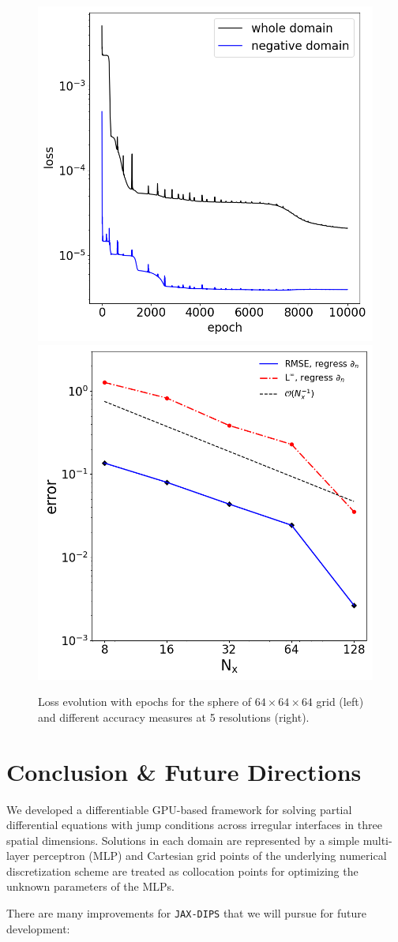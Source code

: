 \documentclass{elsarticle}
\begin{document}
\begin{figure}
	\centering
	\includegraphics[width=0.49\linewidth]{./figures/poisson_solver_loss_star_64x64x64_regress.png}
	\includegraphics[width=0.45\linewidth]{./figures/case_II_regression.png}
	\caption{Loss evolution with epochs for the sphere of $64\times 64\times 64$ grid (left) and different accuracy measures at 5 resolutions (right).}
	\label{fig:lossestar}
\end{figure}

\section{Conclusion \& Future Directions}
We developed a differentiable GPU-based framework for solving partial differential equations with jump conditions across irregular interfaces in three spatial dimensions. Solutions in each domain are represented by a simple multi-layer perceptron (MLP) and Cartesian grid points of the underlying numerical discretization scheme are treated as collocation points for optimizing the unknown parameters of the MLPs. 


There are many improvements for \texttt{JAX-DIPS} that we will pursue for future development:
\end{document}
